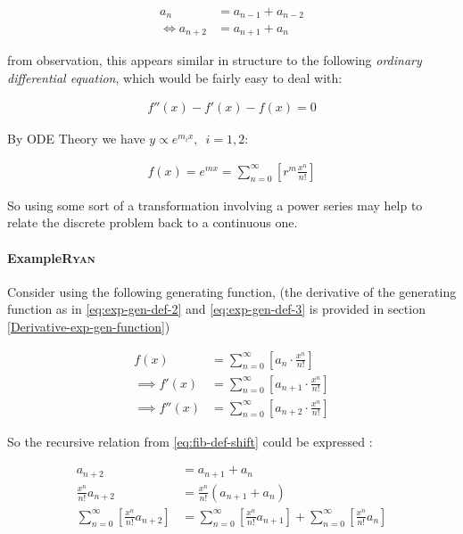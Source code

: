 \documentclass[11pt]{article}
\begin{document}
\begin{align}
    a_{n}&= a_{n - 1} + a_{n - 2} \nonumber \\
\iff a_{n+  2} &= a_{n+  1} +  a_n \label{eq:fib-def-shift}
\end{align}


from observation, this appears similar in structure to the following \emph{ordinary
differential equation}, which would be fairly easy to deal with:


\begin{align*}
f''\left( x \right)- f'\left( x \right)- f\left( x \right)=  0
\end{align*}

By ODE Theory we have \(y \propto e^{m_{i}x}, \enspace i = 1, 2\):

\begin{align*}
f\left( x \right)= e^{mx} = \sum^{\infty}_{n= 0}   \left[ r^{m} \frac{x^n}{n!} \right]
\end{align*}

So using some sort of a transformation involving a power series may help to
relate the discrete problem back to a continuous one.

\paragraph{Example\hfill{}\textsc{Ryan}}
\label{solving-the-sequence}
Consider using the following generating function, (the derivative of the
generating function as in \eqref{eq:exp-gen-def-2} and \eqref{eq:exp-gen-def-3} is
provided in section \ref{Derivative-exp-gen-function})




\begin{align}
    f\left( x \right) &=  \sum^{\infty}_{n= 0}   \left[ a_{n} \cdot  \frac{x^n}{n!} \right]   \label{eq:exp-gen-def-1} \\
 \implies   f'\left( x \right) &=  \sum^{\infty}_{n= 0}   \left[ a_{n+1} \cdot  \frac{x^n}{n!} \right]   \label{eq:exp-gen-def-2} \\
\implies    f''\left( x \right) &=  \sum^{\infty}_{n= 0}   \left[ a_{n+2} \cdot  \frac{x^n}{n!} \right]   \label{eq:exp-gen-def-3}
\end{align}


So the recursive relation from \eqref{eq:fib-def-shift}  could be expressed :


\begin{align*}
a_{n+  2}    &= a_{n+  1} +  a_{n}\\
\frac{x^n}{n!}   a_{n+  2}    &= \frac{x^n}{n!}\left( a_{n+  1} +  a_{n}  \right)\\
\sum^{\infty}_{n= 0} \left[ \frac{x^n}{n!}   a_{n+  2} \right]        &= \sum^{\infty}_{n= 0}   \left[ \frac{x^n}{n!} a_{n+  1} \right]  + \sum^{\infty}_{n= 0}   \left[ \frac{x^n}{n!} a_{n}  \right]  \\
\end{align*}
\end{document}

